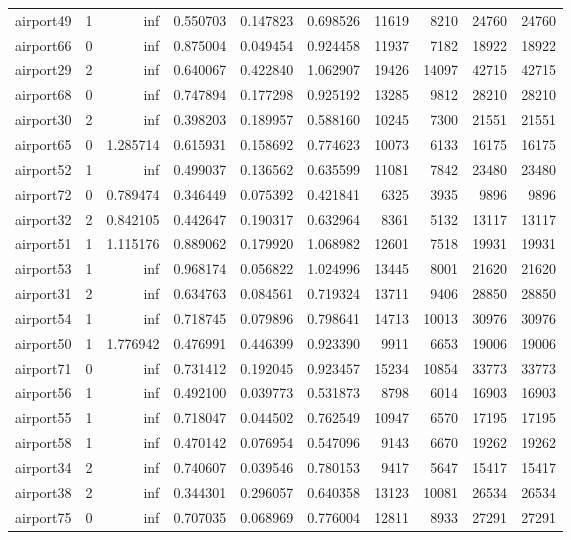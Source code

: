 \begin{longtable}{|l|r|r|r|r|r|r|r|r|r|}
airport49 & 1 & inf & 0.550703 & 0.147823 & 0.698526 & 11619 & 8210 & 24760 & 24760 \\
airport66 & 0 & inf & 0.875004 & 0.049454 & 0.924458 & 11937 & 7182 & 18922 & 18922 \\
airport29 & 2 & inf & 0.640067 & 0.422840 & 1.062907 & 19426 & 14097 & 42715 & 42715 \\
airport68 & 0 & inf & 0.747894 & 0.177298 & 0.925192 & 13285 & 9812 & 28210 & 28210 \\
airport30 & 2 & inf & 0.398203 & 0.189957 & 0.588160 & 10245 & 7300 & 21551 & 21551 \\
airport65 & 0 & 1.285714 & 0.615931 & 0.158692 & 0.774623 & 10073 & 6133 & 16175 & 16175 \\
airport52 & 1 & inf & 0.499037 & 0.136562 & 0.635599 & 11081 & 7842 & 23480 & 23480 \\
airport72 & 0 & 0.789474 & 0.346449 & 0.075392 & 0.421841 & 6325 & 3935 & 9896 & 9896 \\
airport32 & 2 & 0.842105 & 0.442647 & 0.190317 & 0.632964 & 8361 & 5132 & 13117 & 13117 \\
airport51 & 1 & 1.115176 & 0.889062 & 0.179920 & 1.068982 & 12601 & 7518 & 19931 & 19931 \\
airport53 & 1 & inf & 0.968174 & 0.056822 & 1.024996 & 13445 & 8001 & 21620 & 21620 \\
airport31 & 2 & inf & 0.634763 & 0.084561 & 0.719324 & 13711 & 9406 & 28850 & 28850 \\
airport54 & 1 & inf & 0.718745 & 0.079896 & 0.798641 & 14713 & 10013 & 30976 & 30976 \\
airport50 & 1 & 1.776942 & 0.476991 & 0.446399 & 0.923390 & 9911 & 6653 & 19006 & 19006 \\
airport71 & 0 & inf & 0.731412 & 0.192045 & 0.923457 & 15234 & 10854 & 33773 & 33773 \\
airport56 & 1 & inf & 0.492100 & 0.039773 & 0.531873 & 8798 & 6014 & 16903 & 16903 \\
airport55 & 1 & inf & 0.718047 & 0.044502 & 0.762549 & 10947 & 6570 & 17195 & 17195 \\
airport58 & 1 & inf & 0.470142 & 0.076954 & 0.547096 & 9143 & 6670 & 19262 & 19262 \\
airport34 & 2 & inf & 0.740607 & 0.039546 & 0.780153 & 9417 & 5647 & 15417 & 15417 \\
airport38 & 2 & inf & 0.344301 & 0.296057 & 0.640358 & 13123 & 10081 & 26534 & 26534 \\
airport75 & 0 & inf & 0.707035 & 0.068969 & 0.776004 & 12811 & 8933 & 27291 & 27291 \\

\end{longtable}
